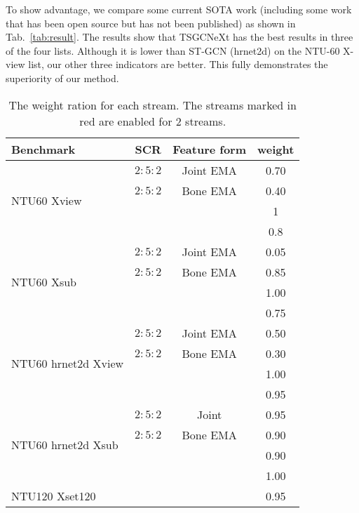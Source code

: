 \documentclass[10pt,twocolumn,letterpaper]{article}
\begin{document}
To show advantage, we compare some current SOTA work (including some work that has been open source but has not been published) as shown in Tab.~\ref{tab:result}. The results show that TSGCNeXt has the best results in three of the four lists. Although it is lower than ST-GCN (hrnet2d) on the NTU-60 X-view list, our other three indicators are better. This fully demonstrates the superiority of our method.

\begin{table}[htbp]
  \centering
  \caption{The weight ration for each stream. The streams marked in red are enabled for 2 streams.}
    \begin{tabular}{l|cc|c}
    \toprule
    Benchmark & SCR &Feature form & weight \\
    \midrule
    \multirow{4}[2]{*}{NTU60 Xview}&$2:5:2$ & Joint EMA & 0.70  \\
          & $2:5:2$& Bone EMA & 0.40  \\
          &\color{red}{$4:3:2$}  &\color{red}{ Joint EMA}& 1  \\
          &\color{red}{$4:3:2$}  & \color{red}{Bone EMA}& 0.8  \\
    \midrule
    \multirow{4}[2]{*}{NTU60 Xsub}& $2:5:2$& Joint EMA & 0.05  \\
         & $2:5:2$& Bone EMA  & 0.85  \\
         &\color{red}{$4:3:2$ } & \color{red}{Joint EMA} & 1.00  \\
         &\color{red}{$4:3:2$}  &\color{red}{ Bone EMA }& 0.75  \\
    \midrule
    \multirow{4}[2]{*}{NTU60 hrnet2d Xview }& $2:5:2$& Joint EMA & 0.50  \\
         & $2:5:2$&Bone EMA& 0.30  \\
         &\color{red}{$4:3:2$  }& \color{red}{Joint EMA} & 1.00  \\
         &\color{red}{$4:3:2$}  & \color{red}{Bone EMA} & 0.95  \\
    \midrule
    \multirow{4}[2]{*}{NTU60 hrnet2d Xsub}& {$2:5:2$}& Joint & 0.95  \\
         & $2:5:2$& Bone EMA  & 0.90  \\
         &\color{red}{$4:3:2$}  & \color{red}{Joint EMA}& 0.90  \\
         &\color{red}{$4:3:2$}  & \color{red}{Bone EMA} & 1.00  \\
    \midrule
    \multirow{4}[2]{*}{NTU120 Xset120}&\color{red}{$2:5:2$} & \color{red}{Joint EMA} & 0.95  \\

\end{tabular}
\end{table}
\end{document}
